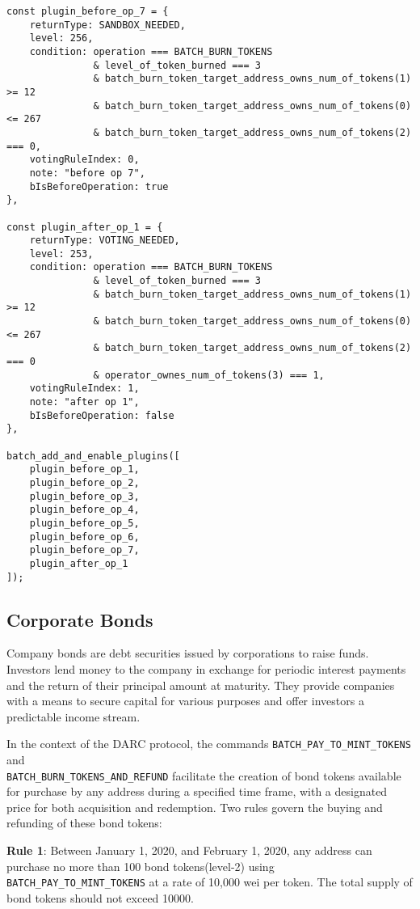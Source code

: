 \documentclass[main.tex]{subfiles}
\begin{document}
\begin{verbatim}
const plugin_before_op_7 = {
    returnType: SANDBOX_NEEDED,
    level: 256, 
    condition: operation === BATCH_BURN_TOKENS
               & level_of_token_burned === 3
               & batch_burn_token_target_address_owns_num_of_tokens(1) >= 12
               & batch_burn_token_target_address_owns_num_of_tokens(0) <= 267
               & batch_burn_token_target_address_owns_num_of_tokens(2) === 0,
    votingRuleIndex: 0, 
    note: "before op 7",
    bIsBeforeOperation: true  
},

const plugin_after_op_1 = {
    returnType: VOTING_NEEDED,
    level: 253, 
    condition: operation === BATCH_BURN_TOKENS
               & level_of_token_burned === 3
               & batch_burn_token_target_address_owns_num_of_tokens(1) >= 12
               & batch_burn_token_target_address_owns_num_of_tokens(0) <= 267
               & batch_burn_token_target_address_owns_num_of_tokens(2) === 0 
               & operator_ownes_num_of_tokens(3) === 1,
    votingRuleIndex: 1, 
    note: "after op 1",
    bIsBeforeOperation: false  
},

batch_add_and_enable_plugins([
    plugin_before_op_1,
    plugin_before_op_2,
    plugin_before_op_3,
    plugin_before_op_4,
    plugin_before_op_5,
    plugin_before_op_6,
    plugin_before_op_7,
    plugin_after_op_1
]);
\end{verbatim}

\subsection{Corporate Bonds}


Company bonds are debt securities issued by corporations to raise funds. Investors lend money to the company in exchange for periodic interest payments and the return of their principal amount at maturity. They provide companies with a means to secure capital for various purposes and offer investors a predictable income stream.

In the context of the DARC protocol, the commands \texttt{BATCH\_PAY\_TO\_MINT\_TOKENS} and \\ \texttt{BATCH\_BURN\_TOKENS\_AND\_REFUND} facilitate the creation of bond tokens available for purchase by any address during a specified time frame, with a designated price for both acquisition and redemption. Two rules govern the buying and refunding of these bond tokens:

\textbf{Rule 1}: Between January 1, 2020, and February 1, 2020, any address can purchase no more than 100 bond tokens(level-2) using \texttt{BATCH\_PAY\_TO\_MINT\_TOKENS} at a rate of 10,000 wei per token. The total supply of bond tokens should not exceed 10000.
\end{document}
